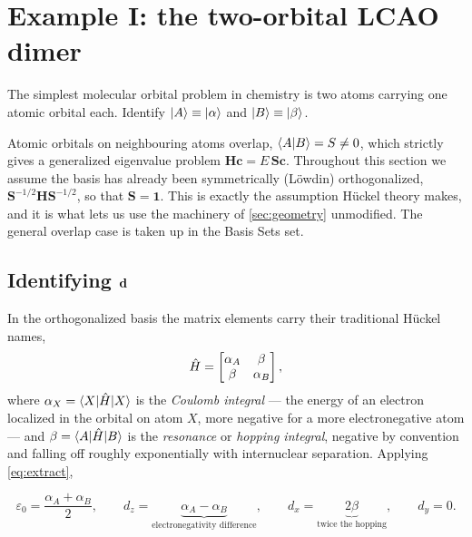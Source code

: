 \section{Example I: the two-orbital LCAO dimer}
\label{sec:dimer}

The simplest molecular orbital problem in chemistry is two atoms carrying one atomic
orbital each. Identify $\ket{A}\equiv\ket{\alpha}$ and $\ket{B}\equiv\ket{\beta}$.

\begin{nbbox}
Atomic orbitals on neighbouring atoms overlap, $\braket{A|B}=S\neq 0$, which strictly
gives a generalized eigenvalue problem $\mathbf{Hc} = E\,\mathbf{Sc}$. Throughout this
section we assume the basis has already been symmetrically (L\"owdin) orthogonalized,
$\mathbf{S}^{-1/2}\mathbf{H}\mathbf{S}^{-1/2}$, so that $\mathbf{S}=\mathbf{1}$. This is
exactly the assumption H\"uckel theory makes, and it is what lets us use the machinery
of \cref{sec:geometry} unmodified. The general overlap case is taken up in the Basis
Sets set.
\end{nbbox}

\subsection{Identifying $\mathbf{d}$}

In the orthogonalized basis the matrix elements carry their traditional H\"uckel names,
%
\begin{equation}
\hat{H} = \begin{bmatrix} \alpha_A & \beta \\ \beta & \alpha_B \end{bmatrix},
\end{equation}
%
where $\alpha_X = \braket{X|\hat{H}|X}$ is the \emph{Coulomb integral} --- the energy of an
electron localized in the orbital on atom $X$, more negative for a more electronegative
atom --- and $\beta = \braket{A|\hat{H}|B}$ is the \emph{resonance} or \emph{hopping
integral}, negative by convention and falling off roughly exponentially with
internuclear separation. Applying \cref{eq:extract},

\begin{keyresult}
\vspace{-0.35cm}
\begin{equation}
\varepsilon_0 = \frac{\alpha_A+\alpha_B}{2},
\qquad
d_z = \underbrace{\alpha_A-\alpha_B}_{\text{electronegativity difference}},
\qquad
d_x = \underbrace{2\beta}_{\text{twice the hopping}},
\qquad
d_y = 0 .
\label{eq:dimer-d}
\end{equation}
\end{keyresult}

